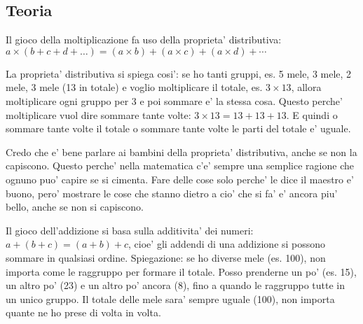 \documentclass[a4paper]{article}
\begin{document}
\subsection{Teoria}
Il gioco della moltiplicazione fa uso della proprieta' distributiva: $a \times (b+c+d+\ldots) = (a\times b)+(a\times c)+(a\times d)+\cdots$

\begin{exemp}
\end{exemp}

La proprieta' distributiva si spiega cosi': se ho tanti gruppi, es. 5 mele,  3 mele, 2 mele, 3 mele (13 in totale) e voglio moltiplicare il totale, es. $3 \times 13$, allora moltiplicare ogni gruppo per 3 e poi sommare e' la stessa cosa. Questo perche' moltiplicare vuol dire sommare tante volte: $3\times 13 = 13+13+13$. E quindi o sommare tante volte il totale o sommare tante volte le parti del totale e' uguale.

\begin{rem}
	Credo che e' bene parlare ai bambini della proprieta' distributiva, anche se non la capiscono. Questo perche' nella matematica c'e' sempre una semplice ragione che ognuno puo' capire se si cimenta. Fare delle cose solo perche' le dice il maestro e' buono, pero' mostrare le cose che stanno dietro a cio' che si fa' e' ancora piu' bello, anche se non si capiscono. 
\end{rem}

Il gioco dell'addizione si basa sulla additivita' dei numeri: $a+(b+c)=(a+b)+c$, cioe' gli addendi di una addizione si possono sommare in qualsiasi ordine. Spiegazione: se ho diverse mele (es. 100), non importa come le raggruppo per formare il totale. Posso prenderne un po' (es. 15), un altro po' (23) e un altro po' ancora (8), fino a quando le raggruppo tutte in un unico gruppo. Il totale delle mele sara' sempre uguale (100), non importa quante ne ho prese di volta in volta.

\printindex
\end{document}
